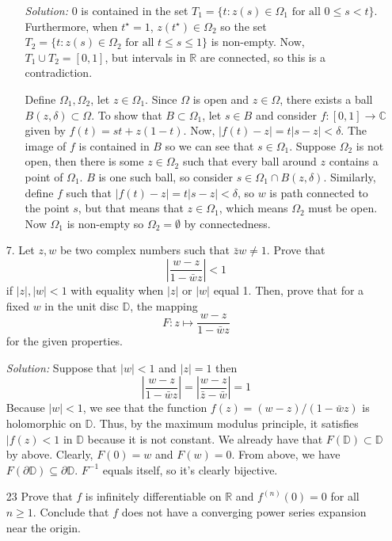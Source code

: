 \documentclass{article}
\newcommand{\R}{\mathbb{R}}
\newcommand{\C}{\mathbb{C}}
\begin{document}
\begin{enumerate}
\begin{enumerate}
        \item[] \textit{Solution:} 0 is contained in the set $T_1 = \{t : z(s)\in \Omega_1\,\, \text{for all $0\le s < t$}\}$. Furthermore, when $t^\star = 1$, $z(t^\star)\in \Omega_2$ so the set $T_2 = \{t : z(s)\in \Omega_2 \,\,\text{for all $t \le s \le 1$}\}$ is non-empty. Now, $T_1\cup T_2 = [0,1]$, but intervals in $\R$ are connected, so this is a contradiction.
        \item[]Define $\Omega_1,\Omega_2$, let $z\in \Omega_1$. Since $\Omega$ is open and $z\in\Omega$, there exists a ball $B(z,\delta)\subset\Omega$. To show that $B\subset \Omega_1$, let $s\in B$ and consider
        $f:[0,1]\to\C$ given by $f(t)=st+z(1-t).$ Now, $|f(t)-z| = t|s-z| < \delta$. The image of $f$ is contained in $B$ so we can see that $s\in \Omega_1$.
        Suppose $\Omega_2$ is not open, then there is some $z\in\Omega_2$ such that every ball around $z$ contains a point of $\Omega_1$. $B$ is one such ball, so consider $s\in \Omega_1\cap B(z,\delta)$.
        Similarly, define $f$ such that $|f(t)-z| = t|s-z| < \delta$, so $w$ is path connected to the point $s$, but that means that $z\in \Omega_1$, which means $\Omega_2$ must be open. Now $\Omega_1$ is non-empty so $\Omega_2=\emptyset$ by connectedness.  
      \end{enumerate}
      \item[7.] Let $z,w$ be two complex numbers such that $\bar{z}w \ne 1$. Prove that 
      \[\left|\frac{w-z}{1-\bar{w}z}\right| < 1\] if $|z|,|w| < 1$ with equality when $|z|$ or $|w|$ equal 1.\newline
      Then, prove that for a fixed $w$ in the unit disc $\mathbb{D}$, the mapping
      \[F: z\mapsto \frac{w-z}{1-\bar{w}z}\]
      for the given properties.
      \item[] \textit{Solution:}
      Suppose that $|w|<1$ and $|z|=1$ then
      \[\left|\frac{w-z}{1-\bar{w}z}\right|= \left|\frac{w-z}{\bar{z}-\bar{w}}\right| = 1\] 
      Because $|w| < 1$, we see that the function $f(z) = (w-z)/(1-\bar{w}z)$ is holomorphic on $\mathbb{D}$. Thus, by the maximum modulus principle, it satisfies $|f(z) < 1$ in $\mathbb{D}$ because it is not constant.\newline
      We already have that $F(\mathbb{D}) \subset \mathbb{D}$ by above. Clearly, $F(0)=w$ and $F(w)=0$. From above, we have $F(\partial\mathbb{D})\subseteq\partial\mathbb{D}$. $F^{-1}$ equals itself, so it's clearly bijective.
      \item[23]Prove that $f$ is infinitely differentiable on $\R$ and $f^{(n)}(0)=0$ for all $n\ge 1$. Conclude that $f$ does not have a converging power series expansion near the origin.

\end{enumerate}
\end{document}
